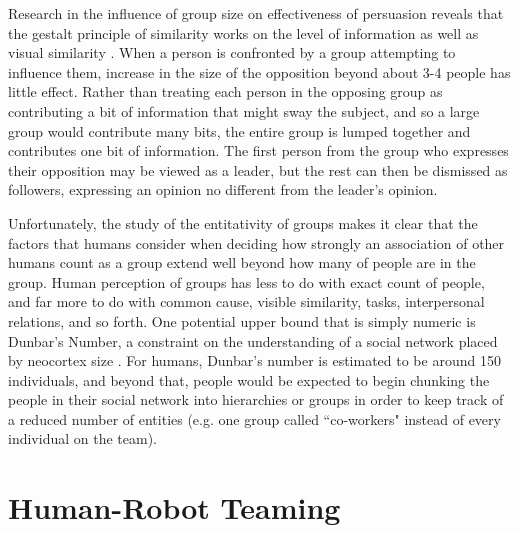 Research in the influence of group size on effectiveness of persuasion reveals that the gestalt principle of similarity works on the level of information as well as visual similarity \citep{wilder1977perception}. 
When a person is confronted by a group attempting to influence them, increase in the size of the opposition beyond about 3-4 people has little effect. 
Rather than treating each person in the opposing group as contributing a bit of information that might sway the subject, and so a large group would contribute many bits, the entire group is lumped together and contributes one bit of information. 
The first person from the group who expresses their opposition may be viewed as a leader, but the rest can then be dismissed as followers, expressing an opinion no different from the leader's opinion. 

Unfortunately, the study of the entitativity of groups makes it clear that the factors that humans consider when deciding how strongly an association of other humans count as a group extend well beyond how many of people are in the group.
Human perception of groups has less to do with exact count of people, and far more to do with common cause, visible similarity, tasks, interpersonal relations, and so forth. 
One potential upper bound that is simply numeric is Dunbar's Number, a constraint on the understanding of a social network placed by neocortex size \citep{dunbar1992neocortex}. 
For humans, Dunbar's number is estimated to be around 150 individuals, and beyond that, people would be expected to begin chunking the people in their social network into hierarchies or groups in order to keep track of a reduced number of entities (e.g. one group called ``co-workers" instead of every individual on the team). 

\section{Human-Robot Teaming} \label{section:human_robot_teaming}

